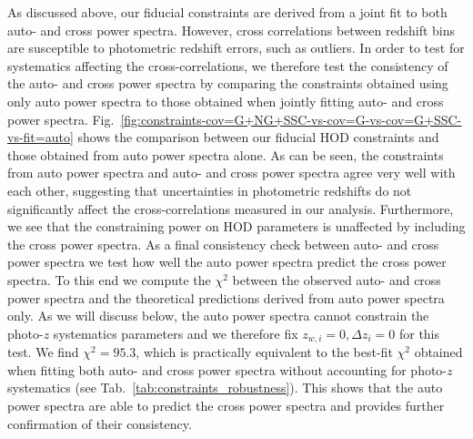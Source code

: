 \documentclass[a4paper,11pt]{article}
\begin{document}
As discussed above, our fiducial constraints are derived from a joint fit to both auto- and cross power spectra. However, cross correlations between redshift bins are susceptible to photometric redshift errors, such as outliers. In order to test for systematics affecting the cross-correlations, we therefore test the consistency of the auto- and cross power spectra by comparing the constraints obtained using only auto power spectra to those obtained when jointly fitting auto- and cross power spectra. Fig.~\ref{fig:constraints-cov=G+NG+SSC-vs-cov=G-vs-cov=G+SSC-vs-fit=auto} shows the comparison between our fiducial HOD constraints and those obtained from auto power spectra alone. As can be seen, the constraints from auto power spectra and auto- and cross power spectra agree very well with each other, suggesting that uncertainties in photometric redshifts do not significantly affect the cross-correlations measured in our analysis. Furthermore, we see that the constraining power on HOD parameters is unaffected by including the cross power spectra. As a final consistency check between auto- and cross power spectra we test how well the auto power spectra predict the cross power spectra. To this end we compute the $\chi^{2}$ between the observed auto- and cross power spectra and the theoretical predictions derived from auto power spectra only. As we will discuss below, the auto power spectra cannot constrain the photo-$z$ systematics parameters and we therefore fix $z_{w, i} = 0, \Delta z_{i} = 0$ for this test. We find $\chi^{2} = 95.3$, which is practically equivalent to the best-fit $\chi^{2}$ obtained when fitting both auto- and cross power spectra without accounting for photo-$z$ systematics (see Tab.~\ref{tab:constraints_robustness}). This shows that the auto power spectra are able to predict the cross power spectra and provides further confirmation of their consistency. 
\end{document}
